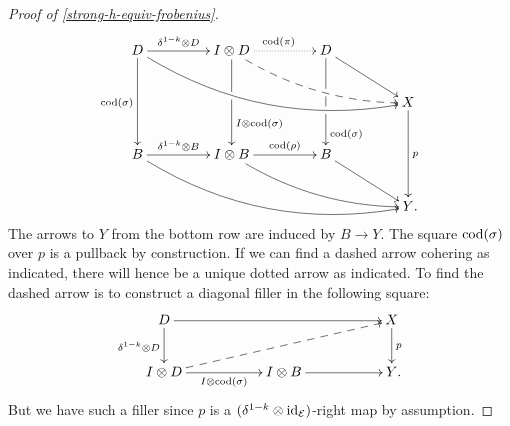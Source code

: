 \documentclass[reqno,10pt,a4paper,oneside,draft]{amsart}
\begin{document}
\begin{proof}[Proof of \cref{strong-h-equiv-frobenius}]
\[
\xymatrix@C+2em{
  D
  \ar[r]^-{\kcylinv \otimes D}
  \ar[dd]_{\cod(\sigma)}
  \ar@/_2em/[drrr]
&
  \interval \otimes D
  \ar@{.>}[r]^{\cod(\pi)}
  \ar[dd]^(0.7){\interval \otimes \cod(\sigma)}|(0.43){\hole}
  \ar@{-->}@/_1em/[drr]
&
  D
  \ar[dd]^(0.8){\cod(\sigma)}|(0.40){\hole}|(0.57){\hole}
  \ar[dr]
\\&&&
  X
  \ar[dd]^{p}
\\
  B
  \ar[r]^-{\kcylinv \otimes B}
  \ar@/_2em/[drrr]
&
  \interval \otimes B
  \ar[r]^-{\cod(\rho)}
  \ar@/_1em/[drr]
&
  B
  \ar[dr]
\\&&&
  Y
\rlap{.}}
\]
The arrows to $Y$ from the bottom row are induced by $B \to Y$.
The square $\operatorname{cod}(\sigma)$ over $p$ is a pullback by construction.
If we can find a dashed arrow cohering as indicated, there will hence be a unique dotted arrow as indicated.
To find the dashed arrow is to construct a diagonal filler in the following square:
\[
\xymatrix@C+3em{
  D
  \ar[rr]
  \ar[d]_{\kcylinv \otimes D}
&&
  X
  \ar[d]^{p}
\\
  \interval \otimes D
  \ar[r]_{I \otimes \cod(\sigma)}
  \ar@{-->}[urr]
&
  \interval \otimes B
  \ar[r]
&
  Y
\rlap{.}}
\]
But we have such a filler since $p$ is a $(\delta^{1-k} \otimes \operatorname{id}_{\mathcal{E}})$-right map by assumption.

\medskip


\end{proof}
\end{document}
